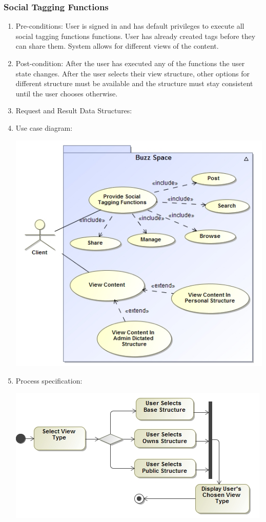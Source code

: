 \documentclass[hidelinks, 12pt, oneside]{article}
\begin{document}
\subsubsection{Social Tagging Functions}
\begin{enumerate}
\item Pre-conditions: User is signed in and has default privileges to execute all social tagging functions functions. User has already created tags before they can share them. System allows for different views of the content.
\item Post-condition: After the user has executed any of the functions the user state changes. After the user selects their view structure, other options for different structure must be available and the structure must stay consistent until the user chooses otherwise.
\item Request and Result Data Structures:
\item Use case diagram:\\
\centerline{\includegraphics[scale=0.5]{socialTagging.jpg}}
    \item Process specification:\\ 
\centerline{\includegraphics[scale=0.5]{socialTaggingActivity.jpg}}

\end{enumerate}
\end{document}
